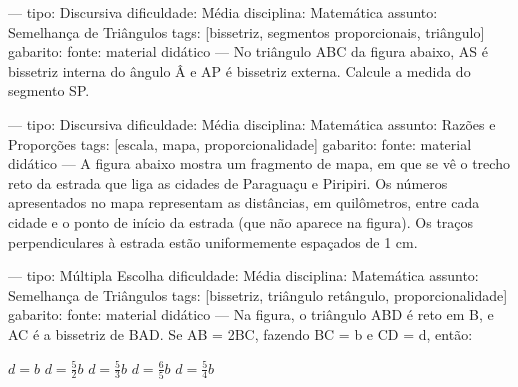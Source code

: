 ---
tipo: Discursiva
dificuldade: Média
disciplina: Matemática
assunto: Semelhança de Triângulos
tags: [bissetriz, segmentos proporcionais, triângulo]
gabarito:
fonte: material didático
---
\question
No triângulo ABC da figura abaixo, AS é bissetriz interna do ângulo Â e AP é bissetriz externa. Calcule a medida do segmento SP.


---
tipo: Discursiva
dificuldade: Média
disciplina: Matemática
assunto: Razões e Proporções
tags: [escala, mapa, proporcionalidade]
gabarito:
fonte: material didático
---
\question
A figura abaixo mostra um fragmento de mapa, em que se vê o trecho reto da estrada que liga as cidades de Paraguaçu e Piripiri. Os números apresentados no mapa representam as distâncias, em quilômetros, entre cada cidade e o ponto de início da estrada (que não aparece na figura). Os traços perpendiculares à estrada estão uniformemente espaçados de 1 cm.


---
tipo: Múltipla Escolha
dificuldade: Média
disciplina: Matemática
assunto: Semelhança de Triângulos
tags: [bissetriz, triângulo retângulo, proporcionalidade]
gabarito:
fonte: material didático
---
\question
Na figura, o triângulo ABD é reto em B, e AC é a bissetriz de BAD. Se AB = 2BC, fazendo BC = b e CD = d, então:
\begin{choices}
\choice $d = b$
\choice $d = \frac{5}{2}b$
\choice $d = \frac{5}{3}b$
\choice $d = \frac{6}{5}b$
\choice $d = \frac{5}{4}b$
\end{choices}

